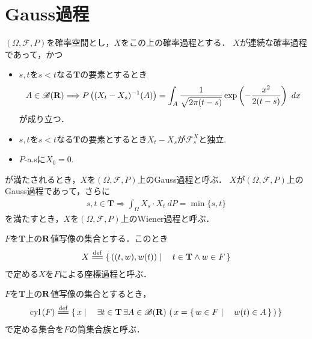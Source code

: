 \section{Gauss過程}
	$(\Omega,\mathscr{F},P)$を確率空間とし，$X$をこの上の確率過程とする．
	$X$が連続な確率過程であって，かつ
	\begin{itemize}
		\item $s,t$を$s < t$なる$\mathbf{T}$の要素とするとき
			\begin{align}
				A \in \mathscr{B}(\mathbf{R}) \Longrightarrow
				P\left((X_t-X_s)^{-1}(A)\right)
				= \int_A \frac{1}{\sqrt{2\pi(t-s)}} \exp\left(-\frac{x^2}{2(t-s)}\right)\ dx
			\end{align}
			が成り立つ．
		
		\item $s,t$を$s < t$なる$\mathbf{T}$の要素とするとき$X_t - X_s$が$\mathscr{F}^X_s$と独立.
			
		\item $P$-a.sに$X_0 = 0$.
	\end{itemize}
	が満たされるとき，$X$を$(\Omega,\mathscr{F},P)$上のGauss過程と呼ぶ．
	$X$が$(\Omega,\mathscr{F},P)$上のGauss過程であって，さらに
	\begin{align}
		s,t \in \mathbf{T} \Longrightarrow \int_\Omega X_s \cdot X_t\ dP = \min{\{s,t\}}
	\end{align}
	を満たすとき，$X$を$(\Omega,\mathscr{F},P)$上のWiener過程と呼ぶ．
	
	\begin{screen}
		\begin{dfn}[座標過程]
			$F$を$\mathbf{T}$上の$\mathbf{R}$値写像の集合とする．このとき
			\begin{align}
				X \defeq \Set{((t,w),w(t))}{t \in \mathbf{T} \wedge w \in F}
			\end{align}
			で定める$X$を$F$による座標過程と呼ぶ．
		\end{dfn}
	\end{screen}
	
	\begin{screen}
		\begin{dfn}[筒集合]
			$F$を$\mathbf{T}$上の$\mathbf{R}$値写像の集合とするとき，
			\begin{align}
				\cyl{F} \defeq 
				\Set{x}{\exists t \in \mathbf{T}\, \exists A \in \borel{\R}\, 
				\left(\, x = \Set{w \in F}{w(t) \in A}\, \right)}
			\end{align}
			で定める集合を$F$の筒集合族と呼ぶ．
		\end{dfn}
	\end{screen}
	
